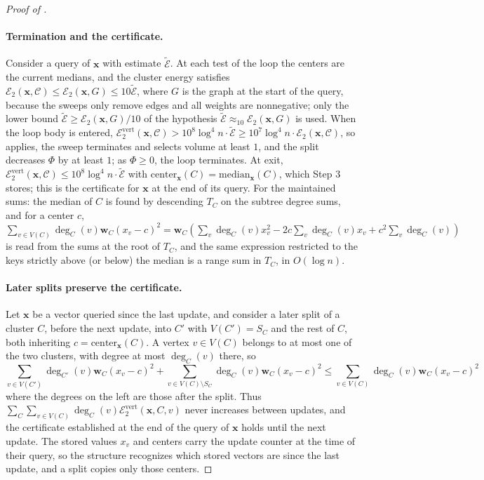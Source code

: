 \documentclass[11pt]{article}
\theoremstyle{remark}
\newcommand{\ww}{\mathbf w}
\newcommand{\xx}{\mathbf x}
\newcommand{\Ccal}{\mathcal{C}}
\newcommand{\Ecal}[1]{\mathcal E_{#1}}
\newcommand{\Ecaltil}{\widetilde{\mathcal{E}}}
\newcommand{\Ecalvert}[1]{\mathcal{E}^{\mathrm{vert}}_{#1}}
\begin{document}
\begin{proof}[Proof of ]
\paragraph{Termination and the certificate.}
Consider a query of $\xx$ with estimate $\Ecaltil$.
At each test of the loop the centers are the current medians, and the
cluster energy satisfies
$\Ecal{2}(\xx, \Ccal) \le \Ecal{2}(\xx, G) \le 10 \Ecaltil$, where $G$ is the
graph at the start of the query, because the sweeps only remove edges and
all weights are nonnegative; only the lower bound
$\Ecaltil \ge \Ecal{2}(\xx, G)/10$ of the hypothesis
$\Ecaltil \approx_{10} \Ecal{2}(\xx, G)$ is used.
When the loop body is entered,
$\Ecalvert{2}(\xx, \Ccal) > 10^{8} \log^{4} n \cdot \Ecaltil
\ge 10^{7} \log^{4} n \cdot \Ecal{2}(\xx, \Ccal)$, so 
applies, the sweep terminates and selects volume at least $1$, and the
split decreases $\Phi$ by at least $1$; as $\Phi \ge 0$, the loop
terminates.
At exit, $\Ecalvert{2}(\xx, \Ccal) \le 10^{8} \log^{4} n \cdot \Ecaltil$
with $\mathrm{center}_{\xx}(C) = \mathrm{median}_{\xx}(C)$, which Step 3
stores; this is the certificate for $\xx$ at the end of its query.
For the maintained sums: the median of $C$ is found by descending $T_C$ on
the subtree degree sums, and for a center $c$,
$\sum_{v \in V(C)} \deg_C(v) \ww_C (x_v - c)^{2}
= \ww_C ( \sum_v \deg_C(v) x_v^{2} - 2c \sum_v \deg_C(v) x_v
+ c^{2} \sum_v \deg_C(v) )$ is read from the sums at the root of $T_C$,
and the same expression restricted to the keys strictly above (or below)
the median is a range sum in $T_C$, in $O(\log n)$.

\paragraph{Later splits preserve the certificate.}
Let $\xx$ be a vector queried since the last update, and consider a later
split of a cluster $C$, before the next update, into $C'$ with
$V(C') = S_C$ and the rest of $C$, both inheriting
$c = \mathrm{center}_{\xx}(C)$.
A vertex $v \in V(C)$ belongs to at most one of the two clusters, with
degree at most $\deg_C(v)$ there, so
\[
\sum_{v \in V(C')} \deg_{C'}(v) \ww_C (x_v - c)^{2}
+ \sum_{v \in V(C) \setminus S_C} \deg_{C}(v) \ww_C (x_v - c)^{2}
\le \sum_{v \in V(C)} \deg_C(v) \ww_C (x_v - c)^{2}
\]
where the degrees on the left are those after the split.
Thus $\sum_C \sum_{v \in V(C)} \deg_C(v) \Ecalvert{2}(\xx, C, v)$ never
increases between updates, and the certificate established at the end of
the query of $\xx$ holds until the next update.
The stored values $x_v$ and centers carry the update counter at the time
of their query, so the structure recognizes which stored vectors are since
the last update, and a split copies only those centers.


\end{proof}
\end{document}
